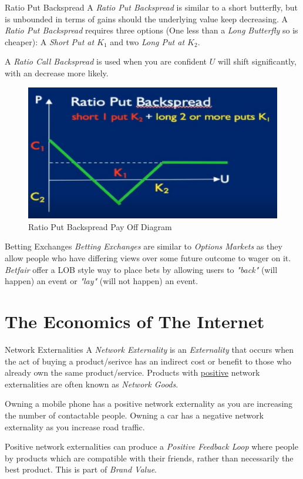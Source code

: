 \documentclass[11pt,a4paper]{article}
\begin{document}
\begin{definition}{Ratio Put Backspread}
  A \textit{Ratio Put Backspread} is similar to a short butterfly, but is unbounded in terms of gains should the underlying value keep decreasing. A \textit{Ratio Put Backspread} requires three options (One less than a \textit{Long Butterfly} so is cheaper):  A \textit{Short Put at $K_1$} and two \textit{Long Put at $K_2$}.
  \par A \textit{Ratio Call Backspread} is used when you are confident $U$ will shift significantly, with an decrease more likely.
\end{definition}

\begin{figure}[ht!]
  \centering
  \includegraphics[width=.5\textwidth]{ratioPutBackspread.PNG}
  \caption{Ratio Put Backspread Pay Off Diagram}
\end{figure}


\begin{proposition}{Betting Exchanges}
  \textit{Betting Exchanges} are similar to \textit{Options Markets} as they allow people who have differing views over some future outcome to wager on it. \textit{Betfair} offer a LOB style way to place bets by allowing users to \textit{"back"} (will happen) an event or \textit{"lay"} (will not happen) an event.
\end{proposition}

\section{The Economics of The Internet}

\begin{definition}{Network Externalities}
  A \textit{Network Externality} is an \textit{Externality} that occurs when the act of buying a product/serivce has an indirect cost or benefit to those who already own the same product/service. Products with \underline{positive} network externalities are often known as \textit{Network Goods}.

  \par Owning a mobile phone has a positive network externality as you are increasing the number of contactable people. Owning a car has a negative network externality as you increase road traffic.

  \par Positive network externalities can produce a \textit{Positive Feedback Loop} where people by products which are compatible with their friends, rather than necessarily the best product. This is part of \textit{Brand Value}.
\end{definition}
\end{document}
